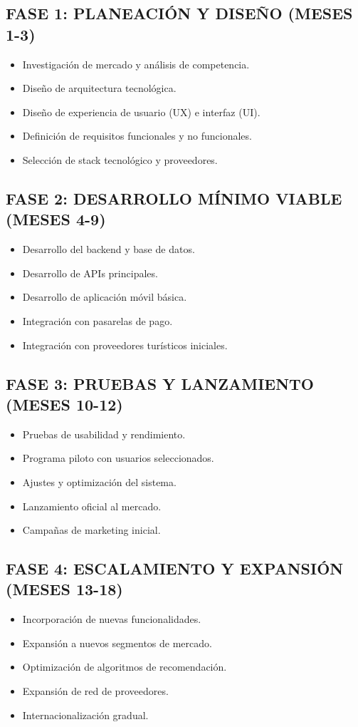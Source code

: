 \documentclass[12pt,a4paper]{article}
\newcommand{\subsectiontitle}[1]{\subsection{#1}}
\begin{document}
\subsectiontitle{FASE 1: PLANEACIÓN Y DISEÑO (MESES 1-3)}

\begin{itemize}
    \item Investigación de mercado y análisis de competencia.
    \item Diseño de arquitectura tecnológica.
    \item Diseño de experiencia de usuario (UX) e interfaz (UI).
    \item Definición de requisitos funcionales y no funcionales.
    \item Selección de stack tecnológico y proveedores.
\end{itemize}

\subsectiontitle{FASE 2: DESARROLLO MÍNIMO VIABLE (MESES 4-9)}

\begin{itemize}
    \item Desarrollo del backend y base de datos.
    \item Desarrollo de APIs principales.
    \item Desarrollo de aplicación móvil básica.
    \item Integración con pasarelas de pago.
    \item Integración con proveedores turísticos iniciales.
\end{itemize}

\subsectiontitle{FASE 3: PRUEBAS Y LANZAMIENTO (MESES 10-12)}

\begin{itemize}
    \item Pruebas de usabilidad y rendimiento.
    \item Programa piloto con usuarios seleccionados.
    \item Ajustes y optimización del sistema.
    \item Lanzamiento oficial al mercado.
    \item Campañas de marketing inicial.
\end{itemize}

\subsectiontitle{FASE 4: ESCALAMIENTO Y EXPANSIÓN (MESES 13-18)}

\begin{itemize}
    \item Incorporación de nuevas funcionalidades.
    \item Expansión a nuevos segmentos de mercado.
    \item Optimización de algoritmos de recomendación.
    \item Expansión de red de proveedores.
    \item Internacionalización gradual.
\end{itemize}
\end{document}
